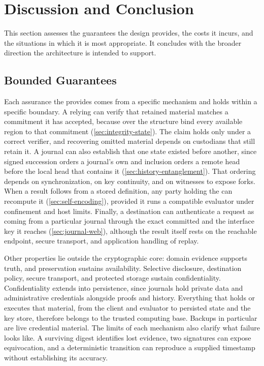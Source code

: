 \section{Discussion and Conclusion}
\label{sec:assessment}

This section assesses the guarantees the design provides, the costs it incurs, and the situations in which it is most appropriate. It concludes with the broader direction the architecture is intended to support.

\subsection{Bounded Guarantees}

Each assurance the  provides comes from a specific mechanism and holds within a specific boundary. A relying  can verify that retained material matches a commitment it has accepted, because  over the  structure bind every available region to that commitment (\cref{sec:integrity-state}). The claim holds only under a correct verifier, and recovering omitted material depends on custodians that still retain it. A journal can also establish that one state existed before another, since signed succession orders a journal's own  and inclusion orders a remote head before the local head that contains it (\cref{sec:history-entanglement}). That ordering depends on synchronization, on key continuity, and on witnesses to expose forks. When a result follows from a stored definition, any party holding the   can recompute it (\cref{sec:self-encoding}), provided it runs a compatible evaluator under confinement and host limits. Finally, a destination can authenticate a request as coming from a particular journal through the exact committed  and the interface key it reaches (\cref{sec:journal-web}), although the result itself rests on the reachable endpoint, secure transport, and application handling of replay.

Other properties lie outside the cryptographic core: domain evidence supports truth, and preservation sustains availability. Selective disclosure, destination policy, secure transport, and protected storage sustain confidentiality. Confidentiality extends into persistence, since journals hold private data and administrative credentials alongside proofs and history. Everything that holds or executes that material, from the client and evaluator to persisted state and the key store, therefore belongs to the trusted computing base. Backups in particular are live credential material. The limits of each mechanism also clarify what failure looks like. A surviving digest identifies lost evidence, two signatures can expose equivocation, and a deterministic transition can reproduce a supplied timestamp without establishing its accuracy.

